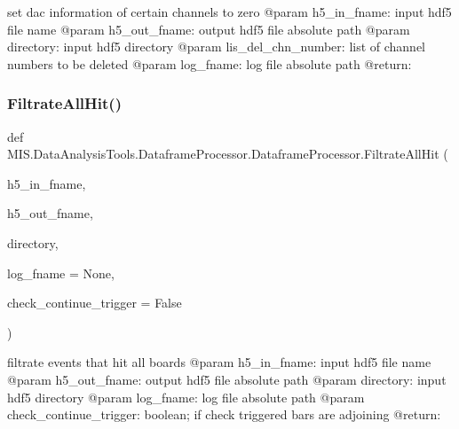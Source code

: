 \begin{DoxyVerb}set dac information of certain channels to zero
@param h5_in_fname: input hdf5 file name
@param h5_out_fname: output hdf5 file absolute path
@param directory: input hdf5 directory
@param lis_del_chn_number: list of channel numbers to be deleted
@param log_fname: log file absolute path
@return:
\end{DoxyVerb}
 \mbox{\label{classMIS_1_1DataAnalysisTools_1_1DataframeProcessor_1_1DataframeProcessor_a3d6b29a9d726bce95ff788e78e6727a4}} 
\subsubsection{\texorpdfstring{Filtrate\+All\+Hit()}{FiltrateAllHit()}}
{\footnotesize\ttfamily def M\+I\+S.\+Data\+Analysis\+Tools.\+Dataframe\+Processor.\+Dataframe\+Processor.\+Filtrate\+All\+Hit (\begin{DoxyParamCaption}\item[{}]{h5\+\_\+in\+\_\+fname,  }\item[{}]{h5\+\_\+out\+\_\+fname,  }\item[{}]{directory,  }\item[{}]{log\+\_\+fname = {\ttfamily None},  }\item[{}]{check\+\_\+continue\+\_\+trigger = {\ttfamily False} }\end{DoxyParamCaption})\hspace{0.3cm}{\ttfamily [static]}}

\begin{DoxyVerb}filtrate events that hit all boards
@param h5_in_fname: input hdf5 file name
@param h5_out_fname: output hdf5 file absolute path
@param directory: input hdf5 directory
@param log_fname: log file absolute path
@param check_continue_trigger: boolean; if check triggered bars are adjoining
@return:
\end{DoxyVerb}
 \mbox{\label{classMIS_1_1DataAnalysisTools_1_1DataframeProcessor_1_1DataframeProcessor_a770a91fb29ef3031ceb7f28dbfe7115b}} 
